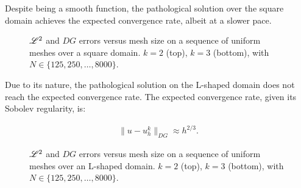 Despite being a smooth function, the pathological solution over the square domain achieves the expected convergence rate, albeit at a slower pace.

\begin{figure}[!ht]
    
    
    \caption{$\mathscr{L}^2$ and $DG$ errors versus mesh size on a sequence of uniform meshes over a square domain. $k = 2$ (top), $k = 3$ (bottom), with $N \in \{125, 250, \dots, 8000\}$.}
\end{figure}

\newpage

Due to its nature, the pathological solution on the L-shaped domain does not reach the expected convergence rate. The expected convergence rate, given its Sobolev regularity, is:

\begin{gather}
    \lVert u - u^k_h \rVert_{DG} \approx h^{2/3}.
\end{gather}

\begin{figure}[!ht]
    
    
    \caption{$\mathscr{L}^2$ and $DG$ errors versus mesh size on a sequence of uniform meshes over an L-shaped domain. $k = 2$ (top), $k = 3$ (bottom), with $N \in \{125, 250, \dots, 8000\}$.}
\end{figure}